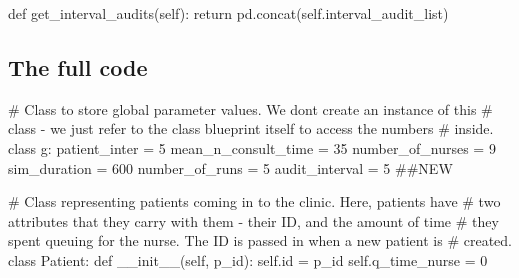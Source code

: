 \documentclass[
  letterpaper,
  DIV=11,
  numbers=noendperiod]{scrreprt}
\newenvironment{Shaded}{}{}
\newcommand{\BuiltInTok}[1]{\textcolor[rgb]{0.84,0.23,0.29}{#1}}
\newcommand{\CommentTok}[1]{\textcolor[rgb]{0.42,0.45,0.49}{#1}}
\newcommand{\ControlFlowTok}[1]{\textcolor[rgb]{0.84,0.23,0.29}{#1}}
\newcommand{\DecValTok}[1]{\textcolor[rgb]{0.00,0.36,0.77}{#1}}
\newcommand{\FunctionTok}[1]{\textcolor[rgb]{0.44,0.26,0.76}{#1}}
\newcommand{\KeywordTok}[1]{\textcolor[rgb]{0.84,0.23,0.29}{#1}}
\newcommand{\NormalTok}[1]{\textcolor[rgb]{0.14,0.16,0.18}{#1}}
\newcommand{\OperatorTok}[1]{\textcolor[rgb]{0.14,0.16,0.18}{#1}}
\newcommand{\VariableTok}[1]{\textcolor[rgb]{0.89,0.38,0.04}{#1}}
\begin{document}
\begin{Shaded}
\begin{Highlighting}[]
\KeywordTok{def}\NormalTok{ get\_interval\_audits(}\VariableTok{self}\NormalTok{):}
  \ControlFlowTok{return}\NormalTok{ pd.concat(}\VariableTok{self}\NormalTok{.interval\_audit\_list)}
\end{Highlighting}
\end{Shaded}

\subsection{The full code}\label{the-full-code-8}

\begin{tcolorbox}[enhanced jigsaw, colframe=quarto-callout-note-color-frame, bottomtitle=1mm, breakable, rightrule=.15mm, coltitle=black, colbacktitle=quarto-callout-note-color!10!white, opacityback=0, leftrule=.75mm, arc=.35mm, toptitle=1mm, title=\textcolor{quarto-callout-note-color}{\faInfo}\hspace{0.5em}{Click here to view the full code}, titlerule=0mm, colback=white, toprule=.15mm, bottomrule=.15mm, left=2mm, opacitybacktitle=0.6]

\begin{Shaded}
\begin{Highlighting}[]
\CommentTok{\# Class to store global parameter values.  We don\textquotesingle{}t create an instance of this}
\CommentTok{\# class {-} we just refer to the class blueprint itself to access the numbers}
\CommentTok{\# inside.}
\KeywordTok{class}\NormalTok{ g:}
\NormalTok{    patient\_inter }\OperatorTok{=} \DecValTok{5}
\NormalTok{    mean\_n\_consult\_time }\OperatorTok{=} \DecValTok{35}
\NormalTok{    number\_of\_nurses }\OperatorTok{=} \DecValTok{9}
\NormalTok{    sim\_duration }\OperatorTok{=} \DecValTok{600}
\NormalTok{    number\_of\_runs }\OperatorTok{=} \DecValTok{5}
\NormalTok{    audit\_interval }\OperatorTok{=} \DecValTok{5} \CommentTok{\#\#NEW}

\CommentTok{\# Class representing patients coming in to the clinic.  Here, patients have}
\CommentTok{\# two attributes that they carry with them {-} their ID, and the amount of time}
\CommentTok{\# they spent queuing for the nurse.  The ID is passed in when a new patient is}
\CommentTok{\# created.}
\KeywordTok{class}\NormalTok{ Patient:}
    \KeywordTok{def} \FunctionTok{\_\_init\_\_}\NormalTok{(}\VariableTok{self}\NormalTok{, p\_id):}
        \VariableTok{self}\NormalTok{.}\BuiltInTok{id} \OperatorTok{=}\NormalTok{ p\_id}
        \VariableTok{self}\NormalTok{.q\_time\_nurse }\OperatorTok{=} \DecValTok{0}


\end{Highlighting}
\end{Shaded}
\end{tcolorbox}
\end{document}
